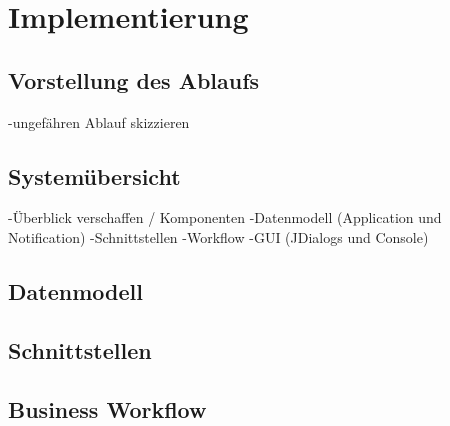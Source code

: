 \section{Implementierung}
\subsection{Vorstellung des Ablaufs}
	-ungefähren Ablauf skizzieren
\subsection{Systemübersicht}
	-Überblick verschaffen / Komponenten
		-Datenmodell (Application und Notification)
		-Schnittstellen
		-Workflow
		-GUI (JDialogs und Console)

\subsection{Datenmodell}

\subsection{Schnittstellen}

\subsection{Business Workflow}

